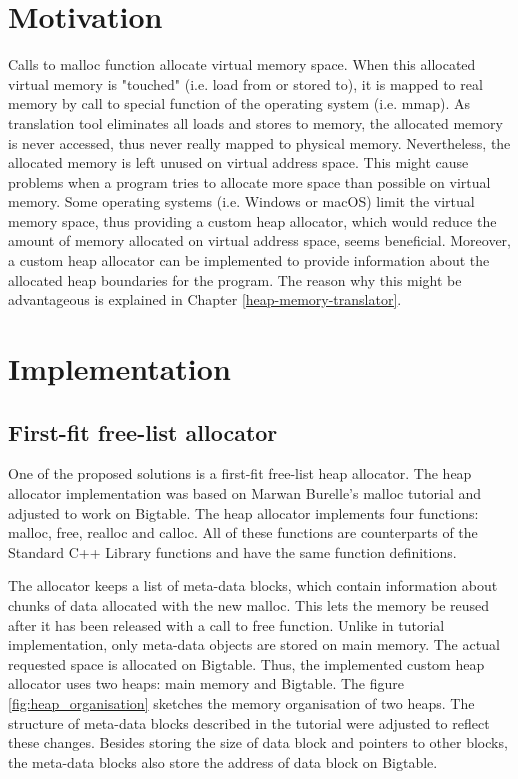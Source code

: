 \documentclass[bsc,frontabs,twoside,singlespacing,parskip,deptreport]{infthesis}     %
\begin{document}
\section{Motivation}

Calls to malloc function allocate virtual memory space. When this allocated virtual memory is "touched" (i.e. load from or stored to), it is mapped to real memory by call to special function of the operating system (i.e. mmap). As translation tool eliminates all loads and stores to memory, the allocated memory is never accessed, thus never really mapped to physical memory. Nevertheless, the allocated memory is left unused on virtual address space. This might cause problems when a program tries to allocate more space than possible on virtual memory. Some operating systems (i.e. Windows or macOS) limit the virtual memory space, thus providing a custom heap allocator, which would reduce the amount of memory allocated on virtual address space, seems beneficial. Moreover, a custom heap allocator can be implemented to provide information about the allocated heap boundaries for the program. The reason why this might be advantageous is explained in Chapter \ref{heap-memory-translator}. 

\section{Implementation}

\subsection{First-fit free-list allocator}

One of the proposed solutions is a first-fit free-list heap allocator. The heap allocator implementation was based on Marwan Burelle's malloc tutorial \citep{malloc_tutorial} and adjusted to work on Bigtable. The heap allocator implements four functions: malloc, free, realloc and calloc. All of these functions are counterparts of the Standard C++ Library functions and have the same function definitions.

The allocator keeps a list of meta-data blocks, which contain information about chunks of data allocated with the new malloc. This lets the memory be reused after it has been released with a call to free function. Unlike in tutorial implementation, only meta-data objects are stored on main memory. The actual requested space is allocated on Bigtable. Thus, the implemented custom heap allocator uses two heaps: main memory and Bigtable. The figure \ref{fig:heap_organisation} sketches the memory organisation of two heaps. The structure of meta-data blocks described in the tutorial were adjusted to reflect these changes. Besides storing the size of data block and pointers to other blocks, the meta-data blocks also store the address of data block on Bigtable.
\end{document}
